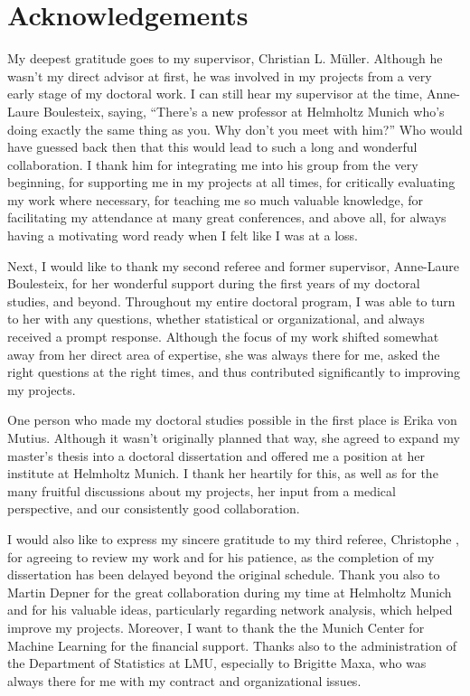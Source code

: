 
\chapter*{Acknowledgements}

My deepest gratitude goes to my supervisor, Christian L. Müller. Although he wasn't my direct advisor at first, he was involved in my projects from a very early stage of my doctoral work. I can still hear my supervisor at the time, Anne-Laure Boulesteix, saying, ``There's a new professor at Helmholtz Munich who's doing exactly the same thing as you. Why don't you meet with him?'' Who would have guessed back then that this would lead to such a long and wonderful collaboration. I thank him for integrating me into his group from the very beginning, for supporting me in my projects at all times, for critically evaluating my work where necessary, for teaching me so much valuable knowledge, for facilitating my attendance at many great conferences, and above all, for always having a motivating word ready when I felt like I was at a loss.

Next, I would like to thank my second referee and former supervisor, Anne-Laure Boulesteix, for her wonderful support during the first years of my doctoral studies, and beyond. Throughout my entire doctoral program, I was able to turn to her with any questions, whether statistical or organizational, and always received a prompt response. Although the focus of my work shifted somewhat away from her direct area of expertise, she was always there for me, asked the right questions at the right times, and thus contributed significantly to improving my projects. 

One person who made my doctoral studies possible in the first place is Erika von Mutius. Although it wasn't originally planned that way, she agreed to expand my master's thesis into a doctoral dissertation and offered me a position at her institute at Helmholtz Munich. I thank her heartily for this, as well as for the many fruitful discussions about my projects, her input from a medical perspective, and our consistently good collaboration. 

I would also like to express my sincere gratitude to my third referee, Christophe , for agreeing to review my work and for his patience, as the completion of my dissertation has been delayed beyond the original schedule. Thank you also to Martin Depner for the great collaboration during my time at Helmholtz Munich and for his valuable ideas, particularly regarding network analysis, which helped improve my projects. Moreover, I want to thank the the Munich Center for Machine Learning for the financial support. Thanks also to the administration of the Department of Statistics at LMU, especially to Brigitte Maxa, who was always there for me with my contract and organizational issues.

